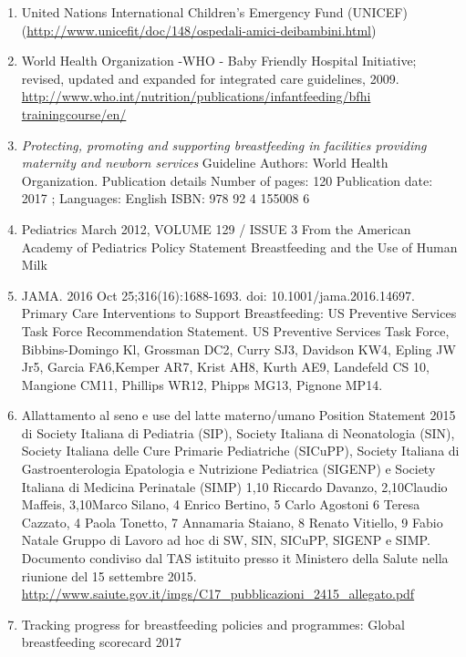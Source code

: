 \documentclass[]{article}
\begin{document}
\begin{enumerate}
\def\labelenumi{\arabic{enumi}.}
\item
  United Nations International Children's Emergency Fund (UNICEF)
  (\url{http://www.unicefit/doc/148/ospedali-amici-deibambini.html})
\item
  World Health Organization -WHO - Baby Friendly Hospital Initiative;
  revised, updated and expanded for integrated care guidelines, 2009.
  \href{http://www.who.int/nutrition/publications/infantfeeding/bfhi\%2520trainingcourse/en/}{http://www.who.int/nutrition/publications/infantfeeding/bfhi
  trainingcourse/en/}
\item
  \emph{Protecting, promoting and supporting breastfeeding in facilities
  providing maternity and newborn services} Guideline Authors: World
  Health Organization. Publication details Number of pages: 120
  Publication date: 2017 ; Languages: English ISBN: 978 92 4 155008 6
\item
  Pediatrics March 2012, VOLUME 129 / ISSUE 3 From the American Academy
  of Pediatrics Policy Statement Breastfeeding and the Use of Human Milk
\item
  JAMA. 2016 Oct 25;316(16):1688-1693. doi: 10.1001/jama.2016.14697.
  Primary Care Interventions to Support Breastfeeding: US Preventive
  Services Task Force Recommendation Statement. US Preventive Services
  Task Force, Bibbins-Domingo Kl, Grossman DC2, Curry SJ3, Davidson KW4,
  Epling JW Jr5, Garcia FA6,Kemper AR7, Krist AH8, Kurth AE9, Landefeld
  CS 10, Mangione CM11, Phillips WR12, Phipps MG13, Pignone MP14.
\item
  Allattamento al seno e use del latte materno/umano Position Statement
  2015 di Society Italiana di Pediatria (SIP), Society Italiana di
  Neonatologia (SIN), Society Italiana delle Cure Primarie Pediatriche
  (SICuPP), Society Italiana di Gastroenterologia Epatologia e
  Nutrizione Pediatrica (SIGENP) e Society Italiana di Medicina
  Perinatale (SIMP) 1,10 Riccardo Davanzo, 2,10Claudio Maffeis,
  3,10Marco Silano, 4 Enrico Bertino, 5 Carlo Agostoni 6 Teresa Cazzato,
  4 Paola Tonetto, 7 Annamaria Staiano, 8 Renato Vitiello, 9 Fabio
  Natale Gruppo di Lavoro ad hoc di SW, SIN, SICuPP, SIGENP e SIMP.
  Documento condiviso dal TAS istituito presso it Ministero della Salute
  nella riunione del 15 settembre 2015.
  \url{http://www.saiute.gov.it/imgs/C17_pubblicazioni_2415_allegato.pdf}
\item
  Tracking progress for breastfeeding policies and programmes: Global
  breastfeeding scorecard 2017

\end{enumerate}
\end{document}
